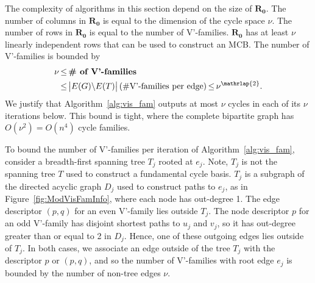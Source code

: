 \documentclass[fleqn,11pt]{article}
\begin{document}
The complexity of algorithms in this section depend on the size of $\bm{R_0}$. The number of columns in $\bm{R_0}$ is equal to the dimension of the cycle space $\nu$. The number of rows in $\bm{R_0}$ is equal to the number of V'-families. $\bm{R_0}$ has at least $\nu$ linearly independent rows that can be used to construct an MCB.
The number of V'-families is bounded by
\begin{equation*}
	\begin{split}
		\nu \,&{\le}\, \textbf{\# of V'-families} \\&{\le}\,\big|E(G){\setminus}E(T)\big|\,(\#\text{V'-families per edge})\,{\le}\,\nu^{\mathrlap{2}}.
	\end{split}
\end{equation*}
We justify that Algorithm~\ref{alg:vis_fam} outputs at most $\nu$ cycles in each of its $\nu$ iterations below. This bound is tight, where the complete bipartite graph has $O(\nu^2)=O(n^4)$ cycle families. 

To bound the number of V'-families per iteration of Algorithm~\ref{alg:vis_fam}, consider a breadth-first spanning tree $T_j$ rooted at $e_j$. %
Note, $T_j$ is not the spanning tree $T$ used to construct a fundamental cycle basis.
$T_j$ is a subgraph of the directed acyclic graph $D_j$ used to construct paths to $e_j$, as in Figure~\ref{fig:ModVisFamInfo}, where each node has {out-degree} 1. 
The edge descriptor $(p,q)$ for an even V'-family lies outside $T_j$. 
The node descriptor $p$ for an odd V'-family has disjoint shortest paths to $u_j$ and $v_j$, so it has out-degree greater than or equal to 2 in $D_j$. 
Hence, one of these outgoing edges lies outside of $T_j$.
In both cases, we associate an edge outside of the tree $T_j$ with the descriptor $p$ or $(p,q)$, and so the number of V'-families with root edge $e_j$ is bounded by the number of non-tree edges $\nu$.
\end{document}
